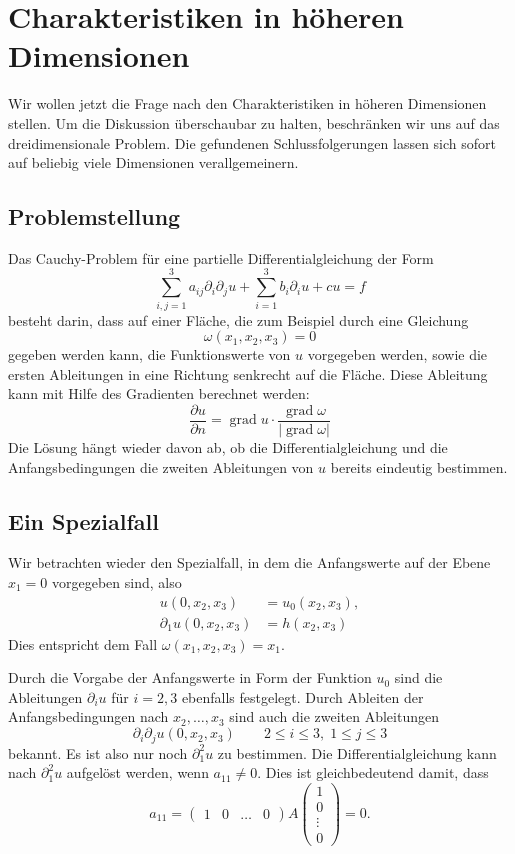 %
%
%
\section{Charakteristiken in höheren Dimensionen}
Wir wollen jetzt die Frage nach den Charakteristiken in höheren Dimensionen
stellen. Um die Diskussion überschaubar zu halten, beschränken wir uns auf
das dreidimensionale Problem. Die gefundenen Schlussfolgerungen 
lassen sich sofort auf beliebig viele Dimensionen verallgemeinern.

\subsection{Problemstellung}
Das Cauchy-Problem für eine partielle Differentialgleichung der
Form
\[
\sum_{i,j=1}^3a_{ij}\partial_i\partial_ju+\sum_{i=1}^3b_i\partial_iu+cu=f
\]
besteht darin, dass auf einer Fläche, die zum Beispiel durch
eine Gleichung
\[
\omega(x_1,x_2,x_3)=0
\]
gegeben werden kann,
die Funktionswerte von $u$ vorgegeben werden, sowie die ersten
Ableitungen in eine Richtung senkrecht auf die Fläche.
Diese Ableitung kann mit Hilfe des Gradienten berechnet werden:
\[
\frac{\partial u}{\partial n}=\operatorname{grad}u\cdot \frac{\operatorname{grad}\omega}{|\operatorname{grad}\omega|}
\]
Die Lösung hängt wieder davon ab, ob die Differentialgleichung
und die Anfangsbedingungen die zweiten Ableitungen von $u$ bereits
eindeutig bestimmen.

\subsection{Ein Spezialfall}
Wir betrachten wieder den Spezialfall, in dem die Anfangswerte auf der
Ebene $x_1=0$ vorgegeben sind, also
\begin{align*}
u(0,x_2,x_3)&=u_0(x_2,x_3),
\\
\partial_1u(0,x_2,x_3)&=h(x_2,x_3)
\end{align*}
Dies entspricht dem Fall $\omega(x_1,x_2,x_3)=x_1$.

Durch die Vorgabe der Anfangswerte in Form der Funktion $u_0$ sind die Ableitungen
$\partial_iu$ für $i=2,3$ ebenfalls festgelegt.
Durch Ableiten der Anfangsbedingungen nach $x_2,\dots,x_3$
sind auch die zweiten Ableitungen 
\[
\partial_i\partial_ju(0,x_2,x_3)\qquad 2\le i\le 3,\;1\le j\le 3
\]
bekannt. Es ist also nur noch $\partial_1^2u$ zu bestimmen.
Die Differentialgleichung kann nach $\partial_1^2u$ aufgelöst
werden, wenn $a_{11}\ne 0$. Dies ist gleichbedeutend damit, dass
\[
a_{11}=\begin{pmatrix}
1&0&\dots&0
\end{pmatrix}
A
\begin{pmatrix}1\\0\\\vdots\\0\end{pmatrix}
=0.
\]

